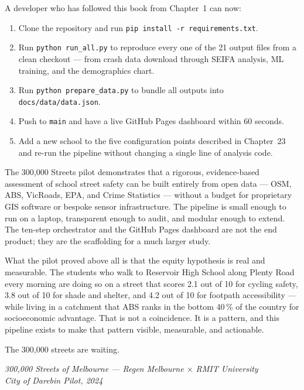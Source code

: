 \documentclass[11pt,a4paper,openany]{book}
\begin{document}
\medskip
A developer who has followed this book from Chapter~1 can now:

\begin{enumerate}
  \item Clone the repository and run \texttt{pip install -r requirements.txt}.
  \item Run \texttt{python run\_all.py} to reproduce every one of the 21 output files
    from a clean checkout --- from crash data download through SEIFA analysis, ML
    training, and the demographics chart.
  \item Run \texttt{python prepare\_data.py} to bundle all outputs into
    \texttt{docs/data/data.json}.
  \item Push to \texttt{main} and have a live GitHub Pages dashboard within 60 seconds.
  \item Add a new school to the five configuration points described in Chapter~23 and
    re-run the pipeline without changing a single line of analysis code.
\end{enumerate}

\medskip\noindent
The 300,000 Streets pilot demonstrates that a rigorous, evidence-based assessment of
school street safety can be built entirely from open data --- OSM, ABS, VicRoads, EPA,
and Crime Statistics --- without a budget for proprietary GIS software or bespoke
sensor infrastructure.  The pipeline is small enough to run on a laptop, transparent
enough to audit, and modular enough to extend.  The ten-step orchestrator and the
GitHub Pages dashboard are not the end product; they are the scaffolding for a much
larger study.

\medskip\noindent
What the pilot proved above all is that the equity hypothesis is real and measurable.
The students who walk to Reservoir High School along Plenty Road every morning are
doing so on a street that scores 2.1 out of 10 for cycling safety, 3.8 out of 10 for
shade and shelter, and 4.2 out of 10 for footpath accessibility --- while living in a
catchment that ABS ranks in the bottom 40\,\% of the country for socioeconomic
advantage.  That is not a coincidence.  It is a pattern, and this pipeline exists to
make that pattern visible, measurable, and actionable.

\medskip\noindent
The 300,000 streets are waiting.

\bigskip
\begin{flushright}
\textit{300,000 Streets of Melbourne --- Regen Melbourne $\times$ RMIT University}\\
\textit{City of Darebin Pilot, 2024}
\end{flushright}
\end{document}
